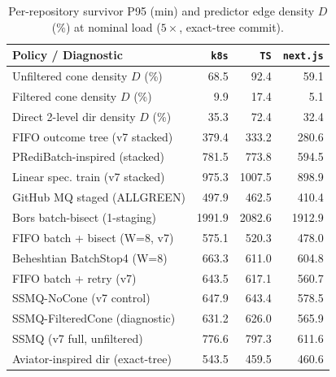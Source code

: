 \begin{table}[t]\centering\scriptsize
\caption{Per-repository survivor P95 (min) and predictor edge density $D$ (\%) at nominal load ($5\times$, exact-tree commit).}\label{tab:v8perrepo}
\setlength{\tabcolsep}{3.0pt}
\begin{tabular}{lrrr}\toprule
Policy / Diagnostic & \texttt{k8s} & \texttt{TS} & \texttt{next.js} \\ \midrule
Unfiltered cone density $D$ (\%) & 68.5 & 92.4 & 59.1 \\
Filtered cone density $D$ (\%) & 9.9 & 17.4 & 5.1 \\
Direct 2-level dir density $D$ (\%) & 35.3 & 72.4 & 32.4 \\
\midrule
FIFO outcome tree (v7 stacked) & 379.4 & 333.2 & 280.6 \\
PRediBatch-inspired (stacked) & 781.5 & 773.8 & 594.5 \\
Linear spec. train (v7 stacked) & 975.3 & 1007.5 & 898.9 \\
GitHub MQ staged (ALLGREEN) & 497.9 & 462.5 & 410.4 \\
Bors batch-bisect (1-staging) & 1991.9 & 2082.6 & 1912.9 \\
FIFO batch + bisect (W=8, v7) & 575.1 & 520.3 & 478.0 \\
Beheshtian BatchStop4 (W=8) & 663.3 & 611.0 & 604.8 \\
FIFO batch + retry (v7) & 643.5 & 617.1 & 560.7 \\
SSMQ-NoCone (v7 control) & 647.9 & 643.4 & 578.5 \\
SSMQ-FilteredCone (diagnostic) & 631.2 & 626.0 & 565.9 \\
SSMQ (v7 full, unfiltered) & 776.6 & 797.3 & 611.6 \\
Aviator-inspired dir (exact-tree) & 543.5 & 459.5 & 460.6 \\
\bottomrule\end{tabular}\end{table}
